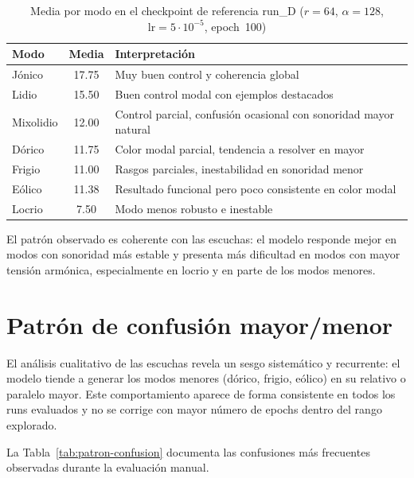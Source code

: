 \documentclass[%
    school=etsisi,%
    type=pfg,%
    degree=61CD,%
]{upm-report}
\begin{document}
\begin{table}[htbp]
    \centering
    \caption{Media por modo en el checkpoint de referencia run\_D ($r=64$, $\alpha=128$, $\text{lr}=5\cdot10^{-5}$, epoch~100)}
    \label{tab:analisis-modos}
    \begin{tabular}{lcl}
        \toprule
        \textbf{Modo} & \textbf{Media} & \textbf{Interpretaci\'on} \\
        \midrule
        J\'onico & 17.75 & Muy buen control y coherencia global \\
        Lidio & 15.50 & Buen control modal con ejemplos destacados \\
        Mixolidio & 12.00 & Control parcial, confusi\'on ocasional con sonoridad mayor natural \\
        D\'orico & 11.75 & Color modal parcial, tendencia a resolver en mayor \\
        Frigio & 11.00 & Rasgos parciales, inestabilidad en sonoridad menor \\
        E\'olico & 11.38 & Resultado funcional pero poco consistente en color modal \\
        Locrio & 7.50 & Modo menos robusto e inestable \\
        \bottomrule
    \end{tabular}
\end{table}

El patr\'on observado es coherente con las escuchas: el modelo responde mejor en modos con sonoridad m\'as estable y presenta m\'as dificultad en modos con mayor tensi\'on arm\'onica, especialmente en locrio y en parte de los modos menores.

\section{Patr\'on de confusi\'on mayor/menor}
\label{s:confusion-mayor-menor}

El an\'alisis cualitativo de las escuchas revela un sesgo sistem\'atico y recurrente: el modelo tiende a generar los modos menores (d\'orico, frigio, e\'olico) en su relativo o paralelo mayor. Este comportamiento aparece de forma consistente en todos los runs evaluados y no se corrige con mayor n\'umero de epochs dentro del rango explorado.

La Tabla~\ref{tab:patron-confusion} documenta las confusiones m\'as frecuentes observadas durante la evaluaci\'on manual.
\end{document}
